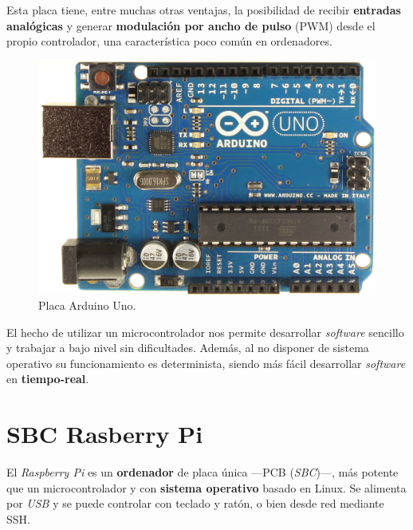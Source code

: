 \smallskip

Esta placa tiene, entre muchas otras ventajas, la posibilidad de recibir \textbf{entradas analógicas} y generar \textbf{modulación por ancho de pulso} (\acrshort{PWM}) desde el propio controlador, una característica poco común en ordenadores.

\smallskip

\begin{figure}[H]
	\noindent \begin{centering}
		\includegraphics[width=\linewidth/2]{capitulo3/arduino}
		\par\end{centering}
	\smallskip
	\caption{\label{fig:arduino} Placa Arduino Uno.}
\end{figure} 

\smallskip

El hecho de utilizar un microcontrolador nos permite desarrollar \textit{software} sencillo y trabajar a bajo nivel sin dificultades. Además, al no disponer de sistema operativo su funcionamiento es determinista, siendo más fácil desarrollar \textit{software} en \textbf{tiempo-real}.

\section{SBC Rasberry Pi}

El \textit{Raspberry Pi} es un \textbf{ordenador} de placa única ---\acrshort{PCB} (\textit{\acrlong{SBC}})---, más potente que un microcontrolador y con \textbf{sistema operativo} basado en Linux. Se alimenta por \textit{USB} y se puede controlar con teclado y ratón, o bien desde red mediante \acrshort{SSH}. 

